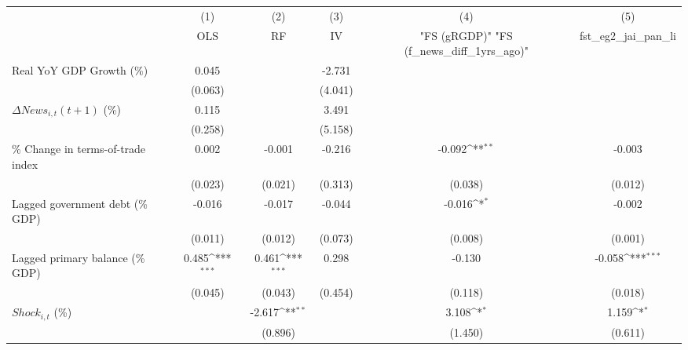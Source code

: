 {
\def\sym#1{\ifmmode^{#1}\else\(^{#1}\)\fi}
\begin{tabular}{l*{5}{c}}
\toprule
                    &\multicolumn{1}{c}{(1)}&\multicolumn{1}{c}{(2)}&\multicolumn{1}{c}{(3)}&\multicolumn{1}{c}{(4)}&\multicolumn{1}{c}{(5)}\\
                    &\multicolumn{1}{c}{OLS}&\multicolumn{1}{c}{RF}&\multicolumn{1}{c}{IV}&\multicolumn{1}{c}{ "FS (gRGDP)"  "FS (f_news_diff_1yrs_ago)" }&\multicolumn{1}{c}{fst_eg2_jai_pan_li}\\
\midrule
Real YoY GDP Growth (\%)&       0.045         &                     &      -2.731         &                     &                     \\
                    &     (0.063)         &                     &     (4.041)         &                     &                     \\
\addlinespace
$ \Delta News_{i,t}(t+1)$ (\%)&       0.115         &                     &       3.491         &                     &                     \\
                    &     (0.258)         &                     &     (5.158)         &                     &                     \\
\addlinespace
\% Change in terms-of-trade index&       0.002         &      -0.001         &      -0.216         &      -0.092\sym{**} &      -0.003         \\
                    &     (0.023)         &     (0.021)         &     (0.313)         &     (0.038)         &     (0.012)         \\
\addlinespace
Lagged government debt (\% GDP)&      -0.016         &      -0.017         &      -0.044         &      -0.016\sym{*}  &      -0.002         \\
                    &     (0.011)         &     (0.012)         &     (0.073)         &     (0.008)         &     (0.001)         \\
\addlinespace
Lagged primary balance (\% GDP)&       0.485\sym{***}&       0.461\sym{***}&       0.298         &      -0.130         &      -0.058\sym{***}\\
                    &     (0.045)         &     (0.043)         &     (0.454)         &     (0.118)         &     (0.018)         \\
\addlinespace
$ Shock_{i,t}$ (\%) &                     &      -2.617\sym{**} &                     &       3.108\sym{*}  &       1.159\sym{*}  \\
                    &                     &     (0.896)         &                     &     (1.450)         &     (0.611)         \\

\end{tabular}}
